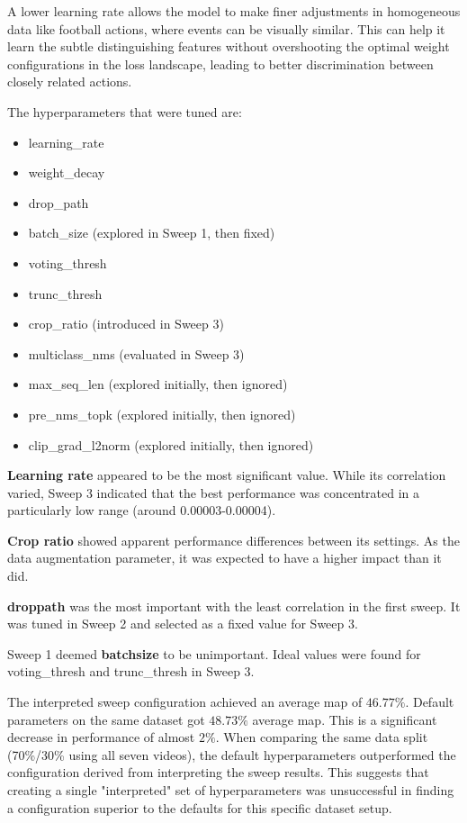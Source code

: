 A lower learning rate allows the model to make finer adjustments in homogeneous data like football actions, where events can be visually similar. This can help it learn the subtle distinguishing features without overshooting the optimal weight configurations in the loss landscape, leading to better discrimination between closely related actions.


The hyperparameters that were tuned are:
\begin{itemize}
    \item learning\_rate
    \item weight\_decay
    \item drop\_path 
    \item batch\_size (explored in Sweep 1, then fixed)
    \item voting\_thresh
    \item trunc\_thresh
    \item crop\_ratio (introduced in Sweep 3)
    \item multiclass\_nms (evaluated in Sweep 3)
    \item max\_seq\_len (explored initially, then ignored)
    \item pre\_nms\_topk (explored initially, then ignored)
    \item clip\_grad\_l2norm (explored initially, then ignored)
\end{itemize}

\textbf{Learning rate} appeared to be the most significant value. While its correlation varied, Sweep 3 indicated that the best performance was concentrated in a particularly low range (around 0.00003-0.00004). 

\textbf{Crop ratio} showed apparent performance differences between its settings. As the data augmentation parameter, it was expected to have a higher impact than it did. 

\textbf{droppath} was the most important with the least correlation in the first sweep. It was tuned in Sweep 2 and selected as a fixed value for Sweep 3. 

Sweep 1 deemed \textbf{batchsize} to be unimportant. Ideal values were found for voting\_thresh and trunc\_thresh in Sweep 3. 



The interpreted sweep configuration achieved an average \acrshort{map} of $46.77\%$. Default parameters on the same dataset got $48.73\%$ average \acrshort{map}. This is a significant decrease in performance of almost $2\%$. When comparing the same data split (70\%/30\% using all seven videos), the default hyperparameters outperformed the configuration derived from interpreting the sweep results. This suggests that creating a single "interpreted" set of hyperparameters was unsuccessful in finding a configuration superior to the defaults for this specific dataset setup.


